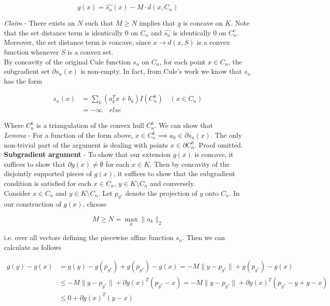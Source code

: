 \documentclass[11pt,reqno]{amsart}
\numberwithin{equation}{section}
\newcommand{\tb}{\textbf}
\newcommand{\wh}{\widehat}
\newcommand{\pa}{\partial}
\begin{document}
\[
g(x) = \widehat{s_n}(x) - M \cdot d(x,C_n) 
\]

\emph{Claim} - There exists an $N$ such that $M \geq N$ implies that $g$ is concave on $K$. Note that the set distance term is identically $0$ on $C_n$ and $\wh{s_n}$ is identically $0$ on $C_n^c$. Moreover, the set distance term is concave, since $x \to d(x,S)$ is a convex function whenever $S$ is a convex set. \\

By concavity of the original Cule function $s_n$ on $C_n$, for each point $x \in C_n$, the subgradient set $\pa s_n(x)$ is non-empty. In fact, from Cule's work we know that $s_n$ has the form 

\begin{align*}
s_n(x) &= \sum_k (a_k^T x + b_k) I(C_n^k) \quad (x \in C_n) \\
&= - \infty \quad else
\end{align*}

Where $C_n^k$ is a triangulation of the convex hull $C_n^k$. We can show that \\

\emph{Lemma} - For a function of the form above, $x \in C_n^k \implies a_k \in \pa s_n(x)$. The only non-trivial part of the argument is dealing with points $x \in \pa C_n^k$. Proof omitted. \\

\tb{Subgradient argument} - To show that our extension $g(x)$ is concave, it suffices to show that $\pa g(x) \not = \emptyset$ for each $x \in K$. Then by concavity of the disjointly supported pieces of $g(x)$, it suffices to show that the subgradient condition is satisfied for each $x \in C_n$, $y \in K \setminus C_n$ and conversely. \\

Consider $x \in C_n$ and $y \in K \setminus C_n$. Let $p_{y^*}$ denote the projection of $y$ onto $C_n$. In our construction of $g(x)$, choose 

\[
M \geq N = \max_{k} \|a_k\|_2 
\]

i.e. over all vectors defining the piecewise affine function $s_n$. Then we can calculate as follows 

\begin{align*}
g(y) - g(x) &= g(y) - g(p_{y^*}) + g(p_{y^*}) - g(x) = -M \|y - p_{y^*}\| + g(p_{y^*}) - g(x) \\
&\leq -M \|y - p_{y^*}\| + \pa g(x)^T(p_{y^*} - x) = -M \|y - p_{y^*}\| + \pa g(x)^T(p_{y^*} - y +y - x) \\
&\leq 0 + \pa g(x)^T(y - x) 
\end{align*}
\end{document}
